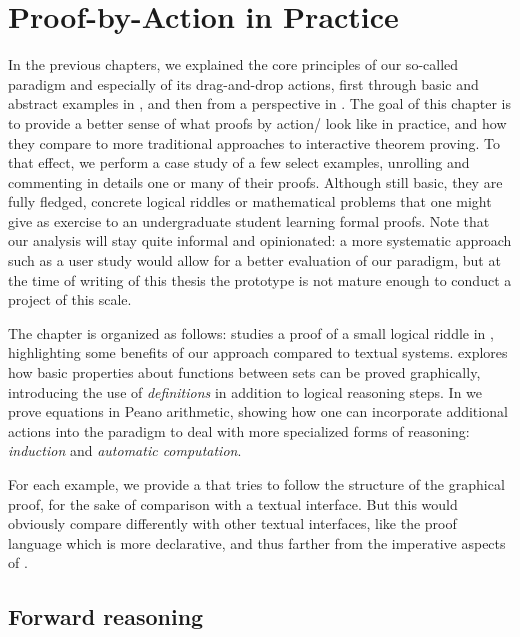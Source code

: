 \setchapterpreamble[u]{\margintoc}
\chapter{Proof-by-Action in Practice}

In the previous chapters, we explained the core principles of our so-called
 paradigm and especially of its drag-and-drop actions, first
through basic and abstract examples in , and then from a
 perspective in . The goal of this chapter is
to provide a better sense of what proofs by action/ look like in
practice, and how they compare to more traditional approaches to interactive
theorem proving. To that effect, we perform a case study of a few select
examples, unrolling and commenting in details one or many of their proofs.
Although still basic, they are fully fledged, concrete logical riddles or
mathematical problems that one might give as exercise to an undergraduate
student learning formal proofs. Note that our analysis will stay quite informal
and opinionated: a more systematic approach such as a user study would allow for
a better evaluation of our paradigm, but at the time of writing of this thesis
the  prototype is not mature enough to conduct a project of this
scale.

The chapter is organized as follows:  studies a proof of a small
logical riddle in , highlighting some benefits of our approach
compared to textual systems.  explores how basic properties about
functions between sets can be proved graphically, introducing the use of
\emph{definitions} in addition to logical reasoning steps. In  we
prove equations in Peano arithmetic, showing how one can incorporate additional
actions into the paradigm to deal with more specialized forms of reasoning:
\emph{induction} and \emph{automatic computation}.

\begin{kaonote}
  For each example, we provide a   that tries to follow
  the structure of the graphical proof, for the sake of comparison with a
  textual interface. But this would obviously compare differently with other
  textual interfaces, like the  proof language which is more
  declarative, and thus farther from the imperative aspects of .
\end{kaonote}
  
\section{Forward reasoning}


